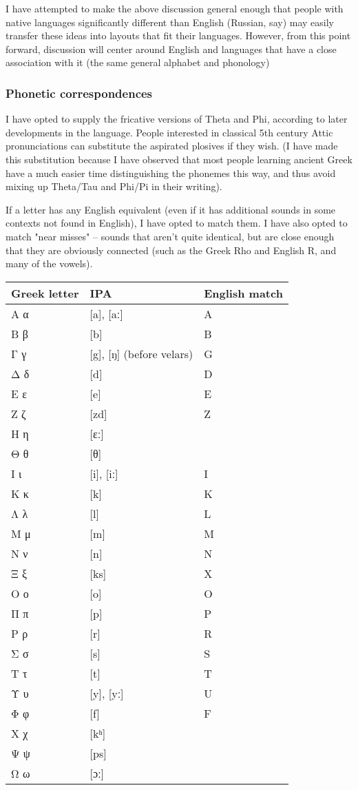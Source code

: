 \documentclass[11pt]{article}
\begin{document}
I have attempted to make the above discussion general enough that people with native languages significantly different than English (Russian, say) may easily transfer these ideas into layouts that fit their languages. However, from this point forward, discussion will center around English and languages that have a close association with it (the same general alphabet and phonology)

\subsubsection{Phonetic correspondences}
\label{sec:org38f5405}

I have opted to supply the fricative versions of Theta and Phi, according to later developments in the language. People interested in classical 5th century Attic pronunciations can substitute the aspirated plosives if they wish. (I have made this substitution because I have observed that most people learning ancient Greek have a much easier time distinguishing the phonemes this way, and thus avoid mixing up Theta/Tau and Phi/Pi in their writing).

If a letter has any English equivalent (even if it has additional sounds in some contexts not found in English), I have opted to match them. I have also opted to match "near misses" -- sounds that aren't quite identical, but are close enough that they are obviously connected (such as the Greek Rho and English R, and many of the vowels).

\begin{center}
\begin{tabular}{lll}
Greek letter & IPA & English match\\
\hline
Α α & [a], [aː] & A\\
Β β & [b] & B\\
Γ γ & [g], [ŋ] (before velars) & G\\
Δ δ & [d] & D\\
Ε ε & [e] & E\\
Ζ ζ & [zd] & Z\\
Η η & [ɛː] & \\
Θ θ & [θ] & \\
Ι ι & [i], [iː] & I\\
Κ κ & [k] & K\\
Λ λ & [l] & L\\
Μ μ & [m] & M\\
Ν ν & [n] & N\\
Ξ ξ & [ks] & X\\
Ο ο & [o] & O\\
Π π & [p] & P\\
Ρ ρ & [r] & R\\
Σ σ & [s] & S\\
Τ τ & [t] & T\\
Υ υ & [y], [yː] & U\\
Φ φ & [f] & F\\
Χ χ & [kʰ] & \\
Ψ ψ & [ps] & \\
Ω ω & [ɔː] & \\
\end{tabular}
\end{center}
\end{document}
